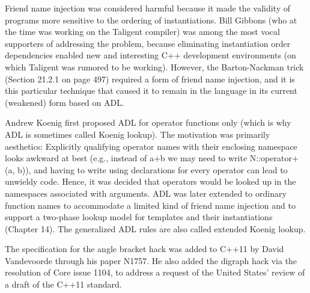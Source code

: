 Friend name injection was considered harmful because it made the validity of programs more sensitive to the ordering of instantiations. Bill Gibbons (who at the time was working on the Taligent compiler) was among the most vocal supporters of addressing the problem, because eliminating instantiation order dependencies enabled new and interesting C++ development environments (on which Taligent was rumored to be working). However, the Barton-Nackman trick (Section 21.2.1 on page 497) required a form of friend name injection, and it is this particular technique that caused it to remain in the language in its current (weakened) form based on ADL.

Andrew Koenig first proposed ADL for operator functions only (which is why ADL is sometimes called Koenig lookup). The motivation was primarily aesthetics: Explicitly qualifying operator names with their enclosing namespace looks awkward at best (e.g., instead of a+b we may need to write N::operator+(a, b)), and having to write using declarations for every operator can lead to unwieldy code. Hence, it was decided that operators would be looked up in the namespaces associated with arguments. ADL was later extended to ordinary function names to accommodate a limited kind of friend name injection and to support a two-phase lookup model for templates and their instantiations (Chapter 14). The generalized ADL rules are also called extended Koenig lookup.

The specification for the angle bracket hack was added to C++11 by David Vandevoorde through his paper N1757. He also added the digraph hack via the resolution of Core issue 1104, to address a request of the United States’ review of a draft of the C++11 standard.
